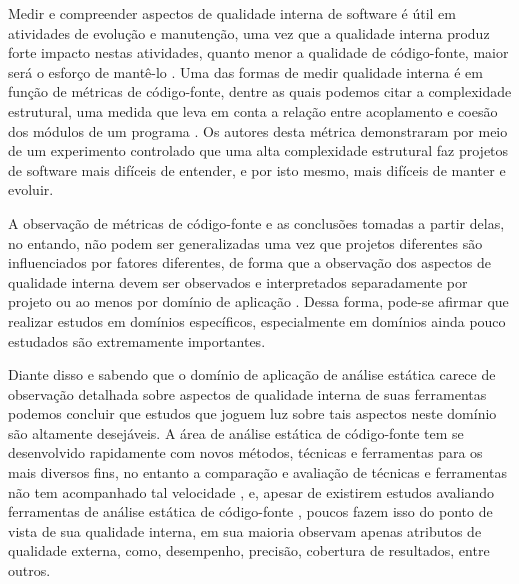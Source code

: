 Medir e compreender aspectos de qualidade interna de software é útil em
atividades de evolução e manutenção, uma vez que a qualidade interna produz
forte impacto nestas atividades, quanto menor a qualidade de código-fonte,
maior será o esforço de mantê-lo \cite{Terceiro2010}. Uma das formas de medir
qualidade interna é em função de métricas de código-fonte, dentre as quais
podemos citar a complexidade estrutural, uma medida que leva em conta a relação
entre acoplamento e coesão dos módulos de um programa \cite{Darcy2005}. Os
autores desta métrica demonstraram por meio de um experimento controlado que
uma alta complexidade estrutural faz projetos de software mais difíceis de
entender, e por isto mesmo, mais difíceis de manter e evoluir.

%

A observação de métricas de código-fonte e as conclusões tomadas a partir
delas, no entando, não podem ser generalizadas uma vez que projetos diferentes
são influenciados por fatores diferentes, de forma que a observação dos
aspectos de qualidade interna devem ser observados e interpretados
separadamente por projeto \cite{Terceiro2012Understanding} ou ao menos por
domínio de aplicação \cite{Meirelles2013}. Dessa forma, pode-se afirmar que
realizar estudos em domínios específicos, especialmente em domínios ainda pouco
estudados são extremamente importantes.


Diante disso e sabendo que o domínio de aplicação de análise estática carece de
observação detalhada sobre aspectos de qualidade interna de suas ferramentas
podemos concluir que estudos que joguem luz sobre tais aspectos neste domínio
são altamente desejáveis. A área de análise estática de código-fonte tem se
desenvolvido rapidamente com novos métodos, técnicas e ferramentas para os mais
diversos fins, no entanto a comparação e avaliação de técnicas e ferramentas
não tem acompanhado tal velocidade \cite{Li2010}, e, apesar de existirem
estudos avaliando ferramentas de análise estática de código-fonte
\cite{Rutar2004, Kratkiewicz2005, Okun2007, Emanuelsson2008, Wedyan2009,
Mantere2009, Al2010, Li2010, Johns2011, Alemerien2013, Ataide2014}, poucos
fazem isso do ponto de vista de sua qualidade interna, em sua maioria observam
apenas atributos de qualidade externa, como, desempenho, precisão, cobertura de
resultados, entre outros.

